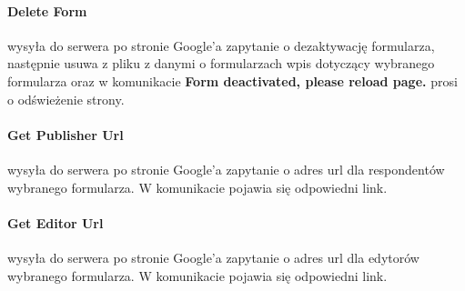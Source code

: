 \paragraph{Delete Form} wysyła do serwera po stronie Google'a zapytanie o dezaktywację formularza, następnie usuwa z pliku z danymi o formularzach wpis dotyczący wybranego formularza oraz w komunikacie \textbf{Form deactivated, please reload page.} prosi o odświeżenie strony.
\paragraph{Get Publisher Url} wysyła do serwera po stronie Google'a zapytanie o adres url dla respondentów wybranego formularza. W komunikacie pojawia się odpowiedni link.
\paragraph{Get Editor Url} wysyła do serwera po stronie Google'a zapytanie o adres url dla edytorów wybranego formularza. W komunikacie pojawia się odpowiedni link.


